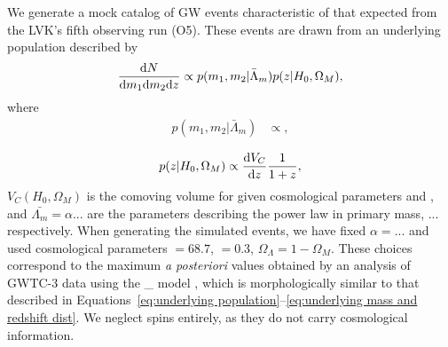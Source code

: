 \documentclass[]{aastex631}
\begin{document}
We generate a mock catalog of GW events characteristic of that expected from the LVK's fifth observing run (O5). 
These events are drawn from an underlying population described by
\begin{equation}
\label{eq:underlying population}
    \frac{\diff N}{\diff m_1 \diff m_2 \diff z} \propto p(m_1, m_2|\bar{\Lambda}_m) p(z|H_0, \Omega_M),
\end{equation}
where 
\begin{align}
    p(m_1,m_2|\bar{\Lambda}_m) &\propto ,\\
\label{eq:underlying mass dist}
\end{align}
\begin{equation}
    p(z|H_0, \Omega_M) \propto \frac{\diff V_C}{\diff z} \frac{1}{1+z},
    \label{eq:underlying redshift dist}
\end{equation}
$V_C(H_0, \Omega_M)$ is the comoving volume for given cosmological parameters \Ho{} and \Omm{}, and $\bar{\Lambda_m} = \alpha$... are the parameters describing the power law in primary mass, ... respectively. 
When generating the simulated events, we have fixed $\alpha= $... and used cosmological parameters \Ho$=68.7$, \Omm$=0.3$, $\Omega_\Lambda=1-\Omega_M$.
These choices correspond to the maximum \emph{a posteriori} values obtained by an analysis of GWTC-3 data using the \_ model \cite{o3b_pop}, which is morphologically similar to that described in Equations~\ref{eq:underlying population}--\ref{eq:underlying mass and redshift dist}.
We neglect spins entirely, as they do not carry cosmological information.
\end{document}
